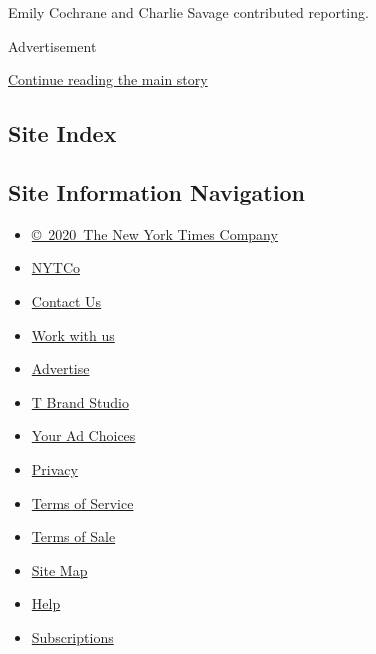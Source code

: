 Emily Cochrane and Charlie Savage contributed reporting.

Advertisement

\protect\hyperlink{after-bottom}{Continue reading the main story}

\hypertarget{site-index}{%
\subsection{Site Index}\label{site-index}}

\hypertarget{site-information-navigation}{%
\subsection{Site Information
Navigation}\label{site-information-navigation}}

\begin{itemize}
\tightlist
\item
  \href{https://help.nytimes.com/hc/en-us/articles/115014792127-Copyright-notice}{©~2020~The
  New York Times Company}
\end{itemize}

\begin{itemize}
\tightlist
\item
  \href{https://www.nytco.com/}{NYTCo}
\item
  \href{https://help.nytimes.com/hc/en-us/articles/115015385887-Contact-Us}{Contact
  Us}
\item
  \href{https://www.nytco.com/careers/}{Work with us}
\item
  \href{https://nytmediakit.com/}{Advertise}
\item
  \href{http://www.tbrandstudio.com/}{T Brand Studio}
\item
  \href{https://www.nytimes.com/privacy/cookie-policy\#how-do-i-manage-trackers}{Your
  Ad Choices}
\item
  \href{https://www.nytimes.com/privacy}{Privacy}
\item
  \href{https://help.nytimes.com/hc/en-us/articles/115014893428-Terms-of-service}{Terms
  of Service}
\item
  \href{https://help.nytimes.com/hc/en-us/articles/115014893968-Terms-of-sale}{Terms
  of Sale}
\item
  \href{https://spiderbites.nytimes.com}{Site Map}
\item
  \href{https://help.nytimes.com/hc/en-us}{Help}
\item
  \href{https://www.nytimes.com/subscription?campaignId=37WXW}{Subscriptions}
\end{itemize}
